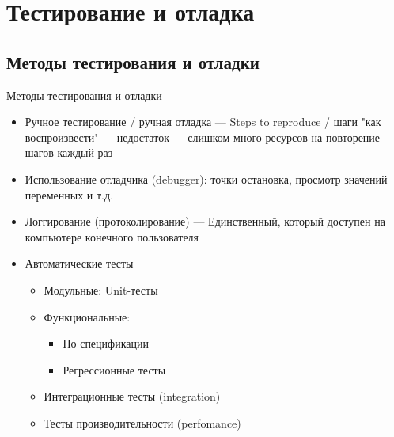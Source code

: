\section{Тестирование и отладка}

\subsection{Методы тестирования и отладки}

\begin{frame}[t]{Методы тестирования и отладки}

  \begin{itemize}
    \item Ручное тестирование / ручная отладка --- Steps to reproduce / шаги "как воспроизвести" --- 
      недостаток --- слишком много ресурсов на повторение шагов каждый раз
    \item Использование отладчика (debugger): точки остановка, просмотр значений переменных и т.д.
    \item Логгирование (протоколирование) --- Единственный, который доступен на компьютере конечного пользователя
    \item Автоматические тесты
    \begin{itemize}
      \item Модульные: Unit-тесты
      \item Функциональные:
      \begin{itemize}
        \item По спецификации 
        \item Регрессионные тесты
      \end{itemize}
      \item Интеграционные тесты (integration)
      \item Тесты производительности (perfomance)
    \end{itemize}  
  \end{itemize}
\end{frame}
